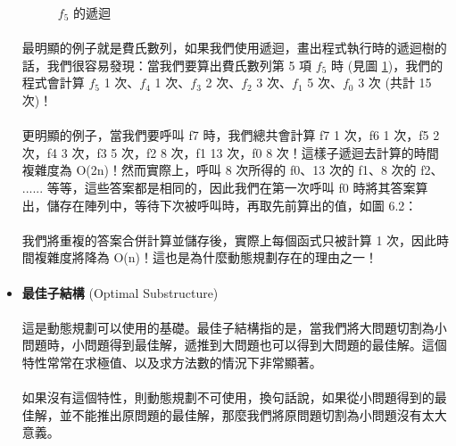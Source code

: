 \documentclass[12pt,a4paper,oneside]{report}
\begin{document}
\begin{CJK}{UTF8}{bkai}
\begin{itemize}
\begin{figure}
  \caption{$f_5$ 的遞迴}
  \label{fig:fibo-recursive}
\end{figure}

\paragraph{}最明顯的例子就是費氏數列，如果我們使用遞迴，畫出程式執行時的遞迴樹的話，我們很容易發現：當我們要算出費氏數列第 5 項 $f_5$ 時 (見圖 \ref{fig:fibo-recursive})，我們的程式會計算 $f_5$ 1 次、$f_4$ 1 次、$f_3$ 2 次、$f_2$ 3 次、$f_1$ 5 次、$f_0$ 3 次 (共計 15 次)！
\paragraph{}更明顯的例子，當我們要呼叫 f7 時，我們總共會計算 f7 1 次，f6 1 次，f5 2 次，f4 3 次，f3 5 次，f2 8 次，f1 13 次，f0 8 次！這樣子遞迴去計算的時間複雜度為 O(2n)！然而實際上，呼叫 8 次所得的 f0、13 次的 f1、8 次的 f2、 ...... 等等，這些答案都是相同的，因此我們在第一次呼叫 f0 時將其答案算出，儲存在陣列中，等待下次被呼叫時，再取先前算出的值，如圖 6.2：
\paragraph{}我們將重複的答案合併計算並儲存後，實際上每個函式只被計算 1 次，因此時間複雜度將降為 O(n)！這也是為什麼動態規劃存在的理由之一！
\paragraph{}

\item \textbf{最佳子結構} (Optimal Substructure)
\paragraph{}這是動態規劃可以使用的基礎。最佳子結構指的是，當我們將大問題切割為小問題時，小問題得到最佳解，遞推到大問題也可以得到大問題的最佳解。這個特性常常在求極值、以及求方法數的情況下非常顯著。
\paragraph{}如果沒有這個特性，則動態規劃不可使用，換句話說，如果從小問題得到的最佳解，並不能推出原問題的最佳解，那麼我們將原問題切割為小問題沒有太大意義。
\paragraph{}


\end{itemize}
\end{CJK}
\end{document}
